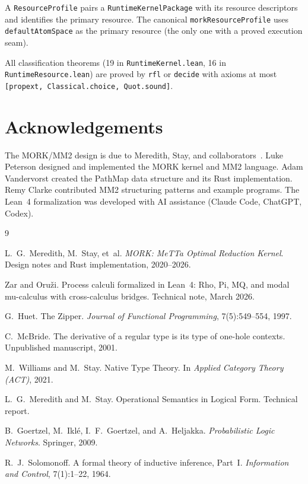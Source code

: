 \documentclass[11pt]{article}
\theoremstyle{definition}
\theoremstyle{remark}
\newcommand{\MORK}{\textup{MORK}}
\newcommand{\MeTTa}{\textup{MeTTa}}
\newcommand{\PathMap}{\textup{PathMap}}
\begin{document}
A \texttt{ResourceProfile} pairs a \texttt{RuntimeKernelPackage} with its
resource descriptors and identifies the primary resource.
The canonical \texttt{morkResourceProfile} uses \texttt{defaultAtomSpace}
as the primary resource (the only one with a proved execution seam).

All classification theorems (19 in \texttt{RuntimeKernel.lean},
16 in \texttt{RuntimeResource.lean}) are proved by \texttt{rfl} or
\texttt{decide} with axioms at most \texttt{[propext, Classical.choice,
Quot.sound]}.

\section*{Acknowledgements}

The \MORK{}/MM2 design is due to Meredith, Stay, and
collaborators~\cite{MeredithStayOSLF2020}.
Luke Peterson designed and implemented the \MORK{} kernel and MM2 language.
Adam Vandervorst created the \PathMap{} data structure and its Rust
implementation.
Remy Clarke contributed MM2 structuring patterns and example programs.
The Lean~4 formalization was developed with AI assistance (Claude Code,
ChatGPT, Codex).

\begin{thebibliography}{9}

L.~G.~Meredith, M.~Stay, et~al.
\newblock \emph{MORK: \MeTTa{} Optimal Reduction Kernel}.
\newblock Design notes and Rust implementation, 2020--2026.

Zar and Oru\v{z}i.
\newblock Process calculi formalized in {Lean}~4: {Rho}, {Pi}, {MQ}, and
  modal mu-calculus with cross-calculus bridges.
\newblock Technical note, March 2026.

G.~Huet.
\newblock The Zipper.
\newblock \emph{Journal of Functional Programming}, 7(5):549--554, 1997.

C.~McBride.
\newblock The derivative of a regular type is its type of one-hole contexts.
\newblock Unpublished manuscript, 2001.

M.~Williams and M.~Stay.
\newblock Native Type Theory.
\newblock In \emph{Applied Category Theory (ACT)}, 2021.

L.~G.~Meredith and M.~Stay.
\newblock Operational Semantics in Logical Form.
\newblock Technical report.

B.~Goertzel, M.~Ikl\'e, I.~F.~Goertzel, and A.~Heljakka.
\newblock \emph{Probabilistic Logic Networks}.
\newblock Springer, 2009.

R.~J.~Solomonoff.
\newblock A formal theory of inductive inference, {Part~I}.
\newblock \emph{Information and Control}, 7(1):1--22, 1964.

\end{thebibliography}
\end{document}
